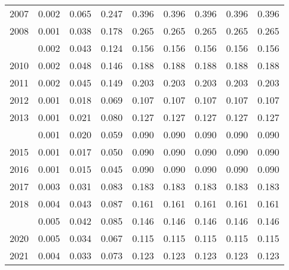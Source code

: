 \documentclass[
]{article}
\begin{document}
\begin{longtable}[t]{lrrrrrrrr}
2007 & 0.002 & 0.065 & 0.247 & 0.396 & 0.396 & 0.396 & 0.396 & 0.396\\
2008 & 0.001 & 0.038 & 0.178 & 0.265 & 0.265 & 0.265 & 0.265 & 0.265\\
\addlinespace
2009 & 0.002 & 0.043 & 0.124 & 0.156 & 0.156 & 0.156 & 0.156 & 0.156\\
2010 & 0.002 & 0.048 & 0.146 & 0.188 & 0.188 & 0.188 & 0.188 & 0.188\\
2011 & 0.002 & 0.045 & 0.149 & 0.203 & 0.203 & 0.203 & 0.203 & 0.203\\
2012 & 0.001 & 0.018 & 0.069 & 0.107 & 0.107 & 0.107 & 0.107 & 0.107\\
2013 & 0.001 & 0.021 & 0.080 & 0.127 & 0.127 & 0.127 & 0.127 & 0.127\\
\addlinespace
2014 & 0.001 & 0.020 & 0.059 & 0.090 & 0.090 & 0.090 & 0.090 & 0.090\\
2015 & 0.001 & 0.017 & 0.050 & 0.090 & 0.090 & 0.090 & 0.090 & 0.090\\
2016 & 0.001 & 0.015 & 0.045 & 0.090 & 0.090 & 0.090 & 0.090 & 0.090\\
2017 & 0.003 & 0.031 & 0.083 & 0.183 & 0.183 & 0.183 & 0.183 & 0.183\\
2018 & 0.004 & 0.043 & 0.087 & 0.161 & 0.161 & 0.161 & 0.161 & 0.161\\
\addlinespace
2019 & 0.005 & 0.042 & 0.085 & 0.146 & 0.146 & 0.146 & 0.146 & 0.146\\
2020 & 0.005 & 0.034 & 0.067 & 0.115 & 0.115 & 0.115 & 0.115 & 0.115\\
2021 & 0.004 & 0.033 & 0.073 & 0.123 & 0.123 & 0.123 & 0.123 & 0.123\\*
\end{longtable}
\end{document}
